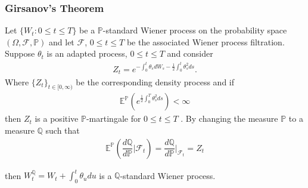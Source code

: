 \subsubsection*{Girsanov's Theorem}

Let $\{W_t :0 \leq t \leq T \}$ be a $\mathbb{P}$-standard Wiener process on the probability space $(\Omega, \mathcal{F}, \mathbb{P})$ and let $\mathcal{F}$, $0 \leq t \leq T$ be the associated Wiener process filtration. Suppose $\theta_t$ is an adapted process, $0 \leq t \leq T$ and consider
\begin{align*}
Z_t=e^{-\int_{0}^{t}\theta_sdW_s-\frac{1}{2}\int_{0}^{t}\theta_s^2ds}.
\end{align*}
Where $\{Z_t\}_{t \in [0,\infty)}$ be the
corresponding density process and if
\begin{align*}
\mathbb{E}^\mathbb{P}\left(e^{\frac{1}{2}\int_{0}^{T}\theta_s^2ds}\right)< \infty
\end{align*}
then $Z_t$ is a positive $\mathbb{P}$-martingale for $0 \leq t \leq T$ . By changing the measure $\mathbb{P}$ to a measure $\mathbb{Q}$
such that
\begin{align*}
\mathbb{E}^\mathbb{P}\left(\dfrac{d\mathbb{Q}}{d\mathbb{P}}\bigg| \mathcal{F}_t\right)=\dfrac{d\mathbb{Q}}{d\mathbb{P}}\bigg|_{\mathcal{F}_t}=Z_t
\end{align*}

then $W_t^\mathbb{Q} = W_t+\int_{0}^{t}\theta_udu$ is a $\mathbb{Q}$-standard Wiener process.\\ \vspace{0.4cm}


